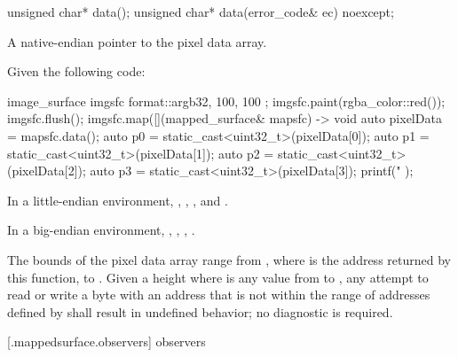 \begin{itemdecl}
unsigned char* data();
unsigned char* data(error_code& ec) noexcept;
\end{itemdecl}
\begin{itemdescr}
\pnum
\returns
A native-endian pointer to the pixel data array.
\begin{example}
Given the following code:

\begin{codeblock}
image_surface imgsfc{ format::argb32, 100, 100 };
imgsfc.paint(rgba_color::red());
imgsfc.flush();
imgsfc.map([](mapped_surface& mapsfc) -> void {
    auto pixelData = mapsfc.data();
    auto p0 = static_cast<uint32_t>(pixelData[0]);
    auto p1 = static_cast<uint32_t>(pixelData[1]);
    auto p2 = static_cast<uint32_t>(pixelData[2]);
    auto p3 = static_cast<uint32_t>(pixelData[3]);
    printf("%
});
\end{codeblock}

In a little-endian environment, , , , and .

In a big-endian environment, , , , .
\end{example}

\pnum
\remarks
The bounds of the pixel data array range from , where  is the address returned by this function, to . Given a height  where  is any value from  to , any attempt to read or write a byte with an address that is not within the range of addresses defined by  shall result in undefined behavior; no diagnostic is required.
\end{itemdescr}

 [\iotwod.mappedsurface.observers]{ observers}

